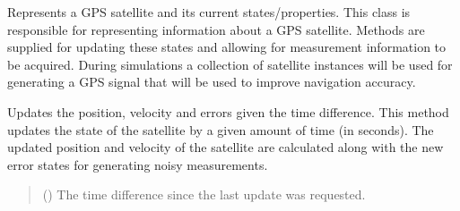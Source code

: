\documentclass[letterpaper,10pt,english]{sphinxmanual}
\begin{document}

\begin{fulllineitems}
\label{\detokenize{modules/gps/satellite:qnav.gps.satellite.Satellite}}
\pysigstartsignatures
{}
\pysigstopsignatures
\sphinxAtStartPar
Represents a GPS satellite and its current states/properties.
This class is responsible for representing information about a GPS
satellite. Methods are supplied for updating these states and allowing
for measurement information to be acquired. During simulations a
collection of satellite instances will be used for generating a GPS signal
that will be used to improve navigation accuracy.

\begin{fulllineitems}
\label{\detokenize{modules/gps/satellite:qnav.gps.satellite.Satellite.update}}
\pysigstartsignatures
{}
\pysigstopsignatures
\sphinxAtStartPar
Updates the position, velocity and errors given the time difference.
This method updates the state of the satellite by a given amount of
time (in seconds). The updated position and velocity of the satellite
are calculated along with the new error states for generating noisy
measurements.
\begin{quote}\begin{description}
\sphinxAtStartPar
{} () \textendash{} The time difference since the last update was requested.


\end{description}
\end{quote}
\end{fulllineitems}
\end{fulllineitems}
\end{document}
